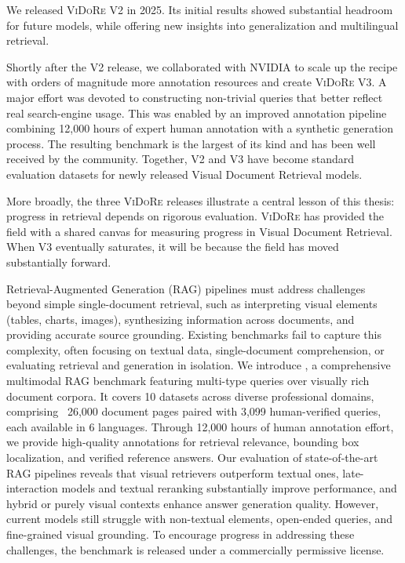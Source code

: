 \begin{sagekaobox}[frametitle=Paper Context]
We released \textsc{ViDoRe} V2 in 2025. 
Its initial results showed substantial headroom for future models, while offering new insights into generalization and multilingual retrieval.

Shortly after the V2 release, we collaborated with NVIDIA to scale up the recipe with orders of magnitude more annotation resources and create \textsc{ViDoRe} V3. A major effort was devoted to constructing non-trivial queries that better reflect real search-engine usage. This was enabled by an improved annotation pipeline combining 12,000 hours of expert human annotation with a synthetic generation process. The resulting benchmark is the largest of its kind and has been well received by the community. Together, V2 and V3 have become standard evaluation datasets for newly released Visual Document Retrieval models.

More broadly, the three \textsc{ViDoRe} releases illustrate a central lesson of this thesis: progress in retrieval depends on rigorous evaluation. \textsc{ViDoRe} has provided the field with a shared canvas for measuring progress in Visual Document Retrieval. When V3 eventually saturates, it will be because the field has moved substantially forward.

\end{sagekaobox}

\begin{kaobox}[frametitle=Paper Abstract]
Retrieval-Augmented Generation (RAG) pipelines must address challenges beyond simple single-document retrieval, such as interpreting visual elements (tables, charts, images), synthesizing information across documents, and providing accurate source grounding. Existing benchmarks fail to capture this complexity, often focusing on textual data, single-document comprehension, or evaluating retrieval and generation in isolation. We introduce \textbf{\vidorev}, a comprehensive multimodal RAG benchmark featuring multi-type queries over visually rich document corpora. It covers 10 datasets across diverse professional domains, comprising ~26,000 document pages paired with 3,099 human-verified queries, each available in 6 languages. Through 12,000 hours of human annotation effort, we provide high-quality annotations for retrieval relevance, bounding box localization, and verified reference answers. Our evaluation of state-of-the-art RAG pipelines reveals that visual retrievers outperform textual ones, late-interaction models and textual reranking substantially improve performance, and hybrid or purely visual contexts enhance answer generation quality. However, current models still struggle with non-textual elements, open-ended queries, and fine-grained visual grounding. To encourage progress in addressing these challenges, the benchmark is released under a commercially permissive license.

\end{kaobox}

